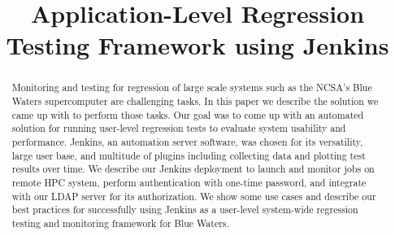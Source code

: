 \documentclass[10pt, conference, compsocconf]{IEEEtran}
\begin{document}
\title{Application-Level Regression Testing Framework using Jenkins}





%

\author{

\and


}

\maketitle
\thispagestyle{plain}

\begin{abstract}
Monitoring and testing for regression of large scale systems such as the NCSA's Blue Waters supercomputer are challenging tasks. 
In this paper we describe the solution we came up with to perform those tasks. 
Our goal was to come up with an automated solution for running user-level regression tests to evaluate system usability and performance.
Jenkins, an automation server software, was chosen for its versatility, large user base, and multitude of plugins including collecting data and plotting test results over time. 
We describe our Jenkins deployment to launch and monitor jobs on remote HPC system, perform authentication with one-time password, and integrate with our LDAP server for its authorization. 
We show some use cases and describe our best practices for successfully using Jenkins as a user-level system-wide regression testing and monitoring framework for Blue Waters.

\end{abstract}
\end{document}
